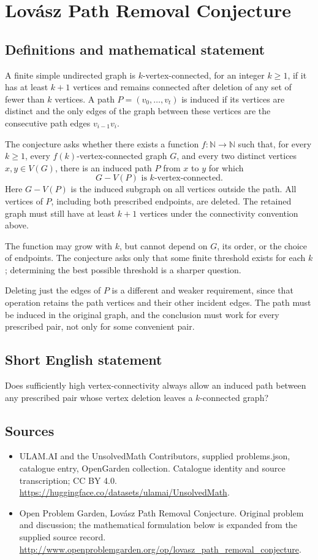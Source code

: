 \documentclass[11pt,a4paper]{article}
\begin{document}
\section*{Lovász Path Removal Conjecture}\label{statement}

\subsection{Definitions and mathematical statement}
A finite simple undirected graph is $k$-vertex-connected, for an integer
$k\ge1$, if it has at least $k+1$ vertices and remains connected after
deletion of any set of fewer than $k$ vertices. A path
$P=(v_0,\ldots,v_t)$ is induced if its vertices are distinct and the
only edges of the graph between these vertices are the consecutive
path edges $v_{i-1}v_i$.

The conjecture asks whether there exists a function
$f:\mathbb N\to\mathbb N$ such that, for every $k\ge1$, every
$f(k)$-vertex-connected graph $G$, and every two distinct vertices
$x,y\in V(G)$, there is an induced path $P$ from $x$ to $y$ for which
\[
 G-V(P)\text{ is }k\text{-vertex-connected}.
\]
Here $G-V(P)$ is the induced subgraph on all vertices outside the path.
All vertices of $P$, including both prescribed endpoints, are deleted.
The retained graph must still have at least $k+1$ vertices under the
connectivity convention above.

The function may grow with $k$, but cannot depend on $G$, its order,
or the choice of endpoints. The conjecture asks only that some finite
threshold exists for each $k$; determining the best possible threshold
is a sharper question.

Deleting just the edges of $P$ is a different and weaker requirement,
since that operation retains the path vertices and their other incident
edges. The path must be induced in the original graph, and the conclusion
must work for every prescribed pair, not only for some convenient pair.
\subsection{Short English statement}
Does sufficiently high vertex-connectivity always allow an induced path between any prescribed pair whose vertex deletion leaves a $k$-connected graph?
\subsection{Sources}
\begin{itemize}
\item[S1] ULAM.AI and the UnsolvedMath Contributors, supplied problems.json, catalogue entry, OpenGarden collection. Catalogue identity and source transcription; CC BY 4.0.
\url{https://huggingface.co/datasets/ulamai/UnsolvedMath}.
\item[S2] Open Problem Garden, Lovász Path Removal Conjecture. Original problem and discussion; the mathematical formulation below is expanded from the supplied source record.
\url{http://www.openproblemgarden.org/op/lovasz_path_removal_conjecture}.
\end{itemize}
\end{document}
